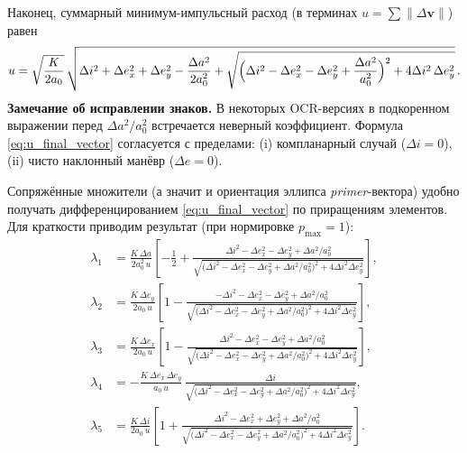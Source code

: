 \documentclass[12pt,a4paper]{article}
\newcommand{\vv}[1]{\bm{#1}}
\begin{document}
Наконец, суммарный минимум-импульсный расход (в терминах $u=\sum\|\Delta\vv v\|$) равен
\begin{equation}\label{eq:u_final_vector}
u=\sqrt{\frac{K}{2a_0}}\,
\sqrt{
\Delta i^2+\Delta e_x^2+\Delta e_y^2-\frac{\Delta a^2}{2a_0^2}
+\sqrt{\Bigl(\Delta i^2-\Delta e_x^2-\Delta e_y^2+\frac{\Delta a^2}{a_0^2}\Bigr)^2+4\Delta i^2\,\Delta e_y^2}
}\,.
\end{equation}
\textbf{Замечание об исправлении знаков.} В некоторых OCR-версиях в подкоренном выражении перед $\Delta a^2/a_0^2$ встречается неверный коэффициент.
Формула \eqref{eq:u_final_vector} согласуется с пределами: (i) компланарный случай ($\Delta i=0$), (ii) чисто наклонный манёвр ($\Delta e=0$).

Сопряжённые множители (а значит и ориентация эллипса \emph{primer}-вектора) удобно получать дифференцированием \eqref{eq:u_final_vector} по приращениям элементов. Для краткости приводим результат (при нормировке $p_{\max}=1$):
\begin{align}
\lambda_1 &= \frac{K\,\Delta a}{2a_0^2\,u}\left[-\frac12+\frac{\Delta i^2-\Delta e_x^2-\Delta e_y^2+\Delta a^2/a_0^2}{\sqrt{\bigl(\Delta i^2-\Delta e_x^2-\Delta e_y^2+\Delta a^2/a_0^2\bigr)^2+4\Delta i^2\Delta e_y^2}}\right],\\
\lambda_2 &= \frac{K\,\Delta e_y}{2a_0\,u}\left[1-\frac{-\Delta i^2-\Delta e_x^2-\Delta e_y^2+\Delta a^2/a_0^2}{\sqrt{\bigl(\Delta i^2-\Delta e_x^2-\Delta e_y^2+\Delta a^2/a_0^2\bigr)^2+4\Delta i^2\Delta e_y^2}}\right],\\
\lambda_3 &= \frac{K\,\Delta e_x}{2a_0\,u}\left[1-\frac{\Delta i^2-\Delta e_x^2-\Delta e_y^2+\Delta a^2/a_0^2}{\sqrt{\bigl(\Delta i^2-\Delta e_x^2-\Delta e_y^2+\Delta a^2/a_0^2\bigr)^2+4\Delta i^2\Delta e_y^2}}\right],\\
\lambda_4 &= -\frac{K\,\Delta e_x\,\Delta e_y}{a_0\,u}\,\frac{\Delta i}{\sqrt{\bigl(\Delta i^2-\Delta e_x^2-\Delta e_y^2+\Delta a^2/a_0^2\bigr)^2+4\Delta i^2\Delta e_y^2}},\\
\lambda_5 &= \frac{K\,\Delta i}{2a_0\,u}\left[1+\frac{\Delta i^2-\Delta e_x^2+\Delta e_y^2+\Delta a^2/a_0^2}{\sqrt{\bigl(\Delta i^2-\Delta e_x^2-\Delta e_y^2+\Delta a^2/a_0^2\bigr)^2+4\Delta i^2\Delta e_y^2}}\right].
\end{align}
\end{document}
